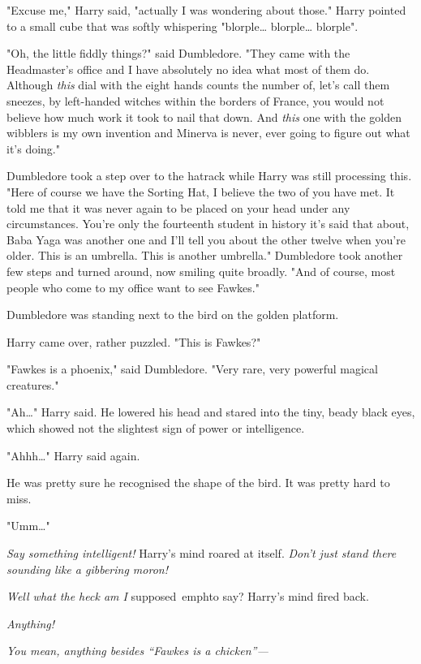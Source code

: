 "Excuse me," Harry said, "actually I was wondering about those." Harry pointed 
to a small cube that was softly whispering "blorple{\ldots} blorple{\ldots} 
blorple".

"Oh, the little fiddly things?" said Dumbledore. "They came with the 
Headmaster's office and I have absolutely no idea what most of them do. 
Although \emph{this} dial with the eight hands counts the number of, let's call 
them sneezes, by left-handed witches within the borders of France, you would 
not believe how much work it took to nail that down. And \emph{this} one with 
the golden wibblers is my own invention and Minerva is never, ever going to 
figure out what it's doing."

Dumbledore took a step over to the hatrack while Harry was still processing 
this. "Here of course we have the Sorting Hat, I believe the two of you have 
met. It told me that it was never again to be placed on your head under any 
circumstances. You're only the fourteenth student in history it's said that 
about, Baba Yaga was another one and I'll tell you about the other twelve when 
you're older. This is an umbrella. This is another umbrella." Dumbledore took 
another few steps and turned around, now smiling quite broadly. "And of course, 
most people who come to my office want to see Fawkes."

Dumbledore was standing next to the bird on the golden platform.

Harry came over, rather puzzled. "This is Fawkes?"

"Fawkes is a phoenix," said Dumbledore. "Very rare, very powerful magical 
creatures."

"Ah{\ldots}" Harry said. He lowered his head and stared into the tiny, beady 
black eyes, which showed not the slightest sign of power or intelligence.

"Ahhh{\ldots}" Harry said again.

He was pretty sure he recognised the shape of the bird. It was pretty hard to 
miss.

"Umm{\ldots}"

\emph{Say something intelligent!} Harry's mind roared at itself. \emph{Don't 
just stand there sounding like a gibbering moron!}

\emph{Well what the heck am I} supposed\ emph{to say?} Harry's mind fired back.

\emph{Anything!}

\emph{You mean, anything besides ``Fawkes is a chicken''---}

